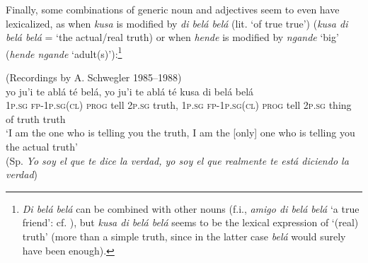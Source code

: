 \documentclass[output=paper,colorlinks,citecolor=brown]{langscibook}
\begin{document}
Finally, some combinations of generic noun and adjectives seem to even have lexicalized, as when \textit{kusa} is modified by \textit{di belá belá} (lit. ‘of true true’) (\textit{kusa di belá belá} = ‘the actual/real truth) or when \textit{hende} is modified by \textit{ngande} ‘big’ (\textit{hende ngande} ‘adult(s)’):\footnote{\textit{Di belá belá} can be combined with other nouns (f.i., \textit{amigo di belá belá} ‘a true friend’: cf. \cite[][xvii]{Schwegler1996}), but \textit{kusa di belá belá} seems to be the lexical expression of ‘(real) truth’ (more than a simple truth, since in the latter case \textit{belá} would surely have been enough).}\largerpage[2]

\ea\label{ex:gut23}(Recordings by A. Schwegler 1985--1988)\\
\gll yo ju’i {te\footnotemark} ablá té belá, yo ju’i te ablá té kusa di belá belá \\
1\textsc{p.sg} \textsc{fp}-1\textsc{p.sg(cl)} \textsc{prog} tell 2\textsc{p.sg} truth, 1\textsc{p.sg} \textsc{fp}-1\textsc{p.sg(cl)} \textsc{prog} tell 2\textsc{p.sg} thing of truth truth \\
\glt ‘I am the one who is telling you the truth, I am the [only] one who is telling you the actual truth’ \\
(Sp. \textit{Yo soy el que te dice la verdad, yo soy el que realmente te está diciendo la verdad})
\z
\end{document}
